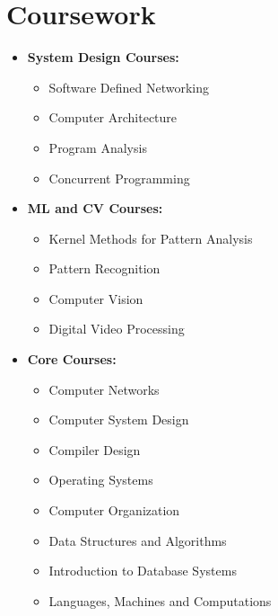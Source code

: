 \documentclass[letterpaper,11pt]{resume}
\begin{document}
\section{Coursework}
\begin{multicols}{2}
{{ \begin{itemize}
    \item{\bf System Design Courses:}
     {\begin{itemize}
	\item Software Defined Networking
	\item Computer Architecture
	\item Program Analysis
 	\item Concurrent Programming
\end{itemize}
}
\item{\bf ML and CV Courses:}
{\begin{itemize}
	\item Kernel Methods for Pattern Analysis
	\item Pattern Recognition

	
 	\item Computer Vision
	\item Digital Video Processing
\end{itemize}
}
\item{\bf Core Courses:}
{\begin{itemize}
	\item Computer Networks
	\item Computer System Design
	\item Compiler Design
	\item Operating Systems
	\item Computer Organization
        \item Data Structures and Algorithms
	\item Introduction to Database Systems
	\item Languages, Machines and Computations	



%         
% 	
        

\end{itemize}}
\end{itemize}}}
\end{multicols}
\end{document}
